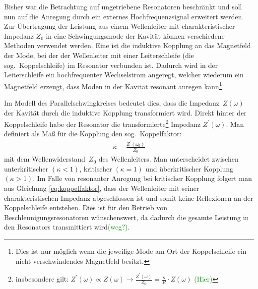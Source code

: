 \documentclass[11pt, a4paper]{scrbook}
\newcommand{\todo}[1]{{\textcolor{Green}{(#1)}}}
\begin{document}
	Bisher war die Betrachtung auf ungetriebene Resonatoren beschränkt und soll nun auf die Anregung durch ein externes Hochfrequenzsignal erweitert werden.
	Zur Übertragung der Leistung aus einem Wellenleiter mit charakteristischer Impedanz $Z_0$ in eine Schwingungsmode der Kavität können verschiedene Methoden verwendet werden.
	Eine ist die induktive Kopplung an das Magnetfeld der Mode, bei der der Wellenleiter mit einer Leiterschleife (die sog.\ Koppelschleife) im Resonator verbunden ist.
	Dadurch wird in der Leiterschleife ein hochfrequenter Wechselstrom angeregt, welcher wiederum ein Magnetfeld erzeugt, dass Moden in der Kavität resonant anregen kann\footnote{Dies ist nur möglich wenn die jeweilige Mode am Ort der Koppelschleife ein nicht verschwindendes Magnetfeld besitzt.}.
	
	Im Modell des Parallelschwingkreises bedeutet dies, dass die Impedanz~$Z(\omega)$ der Kavität durch die induktive Kopplung transformiert wird.
	Direkt hinter der Koppelschleife habe der Resonator die transformierte\footnote{insbesondere gilt: $Z^\prime(\omega) \propto Z(\omega) \longrightarrow \frac{Z^\prime(\omega)}{Z_0} = \frac{\kappa}{R} \cdot Z(\omega)$ \todo{Hier}} Impedanz $Z^\prime(\omega)$.
	Man definiert als Maß für die Kopplung den sog.\ Koppelfaktor:
	\begin{align}
		\kappa = \frac{Z^\prime(\omega_0)}{Z_0}
		\label{eq:koppelfaktor}
	\end{align}
	mit dem Wellenwiderstand~$Z_0$ des Wellenleiters.
	Man unterscheidet zwischen unterkritischer $(\kappa < 1)$, kritischer $(\kappa = 1)$ und überkritischer Kopplung $(\kappa > 1)$.
	Im Falle von resonanter Anregung bei kritischer Kopplung folgert man aus Gleichung \eqref{eq:koppelfaktor}, dass der Wellenleiter mit seiner charakteristischen Impedanz abgeschlossen ist und somit keine Reflexionen an der Koppelschleife entstehen.
	Dies ist für den Betrieb von Beschleunigungsresonatoren wünschenswert, da dadurch die gesamte Leistung in den Resonators transmittiert wird\todo{weg?}.
	
\end{document}
